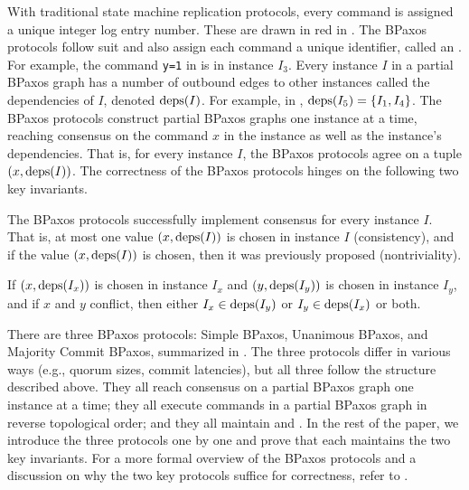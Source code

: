 With traditional state machine replication protocols, every command is assigned
a unique integer log entry number. These are drawn in red in
. The BPaxos protocols follow suit and also assign each
command a unique identifier, called an . For example, the
command \texttt{y=1} in  is in instance $I_3$. Every instance
$I$ in a partial BPaxos graph has a number of outbound edges to other instances
called the dependencies of $I$, denoted $\text{deps}(I)$. For example, in
, $\text{deps}(I_5) = \{I_1, I_4\}$.
%
The BPaxos protocols construct partial BPaxos graphs one instance at a time,
reaching consensus on the command $x$ in the instance as well as the instance's
dependencies. That is, for every instance $I$, the BPaxos protocols agree on a
tuple $(x, \text{deps}(I))$.
%
The correctness of the BPaxos protocols hinges on the following two key
invariants.

\begin{invariant}
  The BPaxos protocols successfully implement consensus for every instance $I$.
  That is, at most one value $(x, \text{deps}(I))$ is chosen in instance $I$
  (consistency), and if the value $(x, \text{deps}(I))$ is chosen, then it was
  previously proposed (nontriviality).
\end{invariant}%
%
\begin{invariant}[Visibility]
  If $(x, \text{deps}(I_x))$ is chosen in instance $I_x$ and $(y, \text{deps}(I_y))$ is
  chosen in instance $I_y$, and if $x$ and $y$ conflict, then either $I_x \in
  \text{deps}(I_y)$ or $I_y \in \text{deps}(I_x)$ or both.
\end{invariant}

There are three BPaxos protocols: Simple BPaxos, Unanimous BPaxos, and Majority
Commit BPaxos, summarized in . The three protocols differ
in various ways (e.g., quorum sizes, commit latencies), but all
three follow the structure described above. They all reach consensus on a
partial BPaxos graph one instance at a time; they all execute commands in a
partial BPaxos graph in reverse topological order; and they all maintain  and
. In the rest of the paper, we introduce the
three protocols one by one and prove that each maintains the two key
invariants. For a more formal overview of the BPaxos protocols and a discussion
on why the two key protocols suffice for correctness, refer to
.

